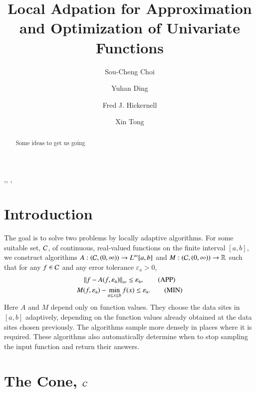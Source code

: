 \documentclass[review]{elsarticle}
\newcommand{\abstol}{\varepsilon_{\textrm{a}}}
\theoremstyle{definition}
\begin{document}
\begin{frontmatter}

\title{Local Adpation for Approximation and Optimization of Univariate Functions}


\author{Sou-Cheng Choi}
\author{Yuhan Ding}
\author{Fred J. Hickernell}
\author{Xin Tong}
\address{Department of Applied Mathematics, Illinois Institute of Technology, RE 208, 10 West 32$^{\text{nd}}$ Street, Chicago, Illinois, 60616, USA}

\begin{abstract}
Some ideas to get us going
\end{abstract}

\begin{keyword}
\sep \sep
\MSC[2010]  \sep
\end{keyword}

\end{frontmatter}

\section{Introduction} \label{sec:intro}

The goal is to solve two problems by locally adaptive algorithms. For some suitable set, $\mathcal{C}$, of continuous,
real-valued functions on the finite interval $[a,b]$, we  construct
algorithms $A:(\mathcal{C},(0,\infty)) \to L^{\infty}[a,b]$ and $M: (\mathcal{C},(0,\infty)) \to
\mathbb{R}$ such that for any $f \in \mathcal{C}$ and any error tolerance $\abstol > 0$,
\begin{gather}
\norm[\infty]{f - A(f,\abstol)} \le \abstol,  \tag{APP} \label{appxprob} \\
M(f,\abstol) - \min_{a \le x \le b} f(x)  \le \abstol. \tag{MIN} \label{optprob}
\end{gather}
Here $A$ and $M$ depend only on function values. They choose the data sites in $[a,b]$ adaptively, depending on the function values already obtained at the data sites chosen previously.  The algorithms sample more densely in places where it is required.  These
algorithms also automatically determine when to stop sampling the input function
and return their answers.



\section{The Cone, $\mathcal{C}$} \label{sec:cone}
\end{document}
